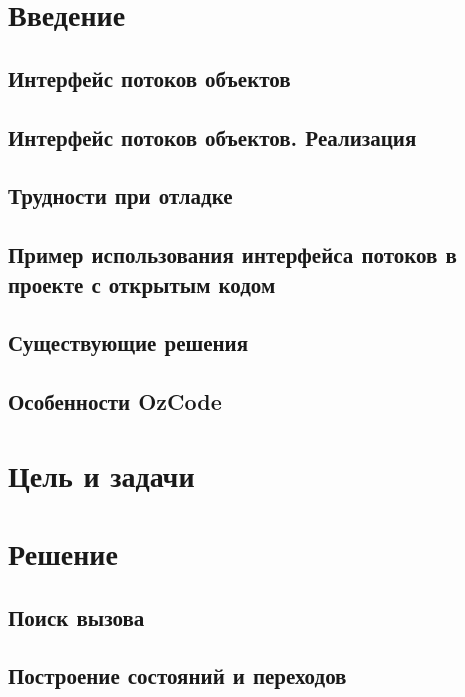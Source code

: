 

\section{Введение}

\subsection{Интерфейс потоков объектов}

\subsection{Интерфейс потоков объектов. Реализация}


\subsection{Трудности при отладке}

\subsection{Пример использования интерфейса потоков в проекте с открытым кодом}

\subsection{Существующие решения}

\subsection{Особенности OzCode}

\section{Цель и задачи}

\section{Решение}
\subsection{Поиск вызова}

\subsection{Построение состояний и переходов}


